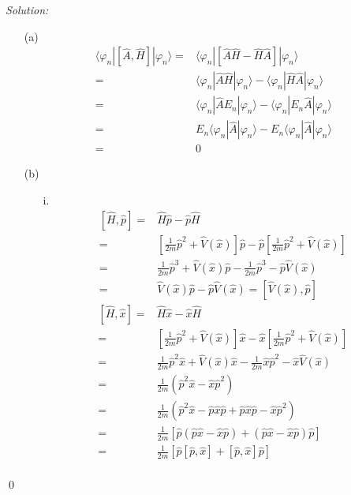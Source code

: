\documentclass[12pt,a4paper]{article}
\newenvironment{sol}
    {\emph{Solution:}
    }
    {
    \qed
    }
\begin{document}
\begin{sol}
\begin{itemize}
\item[(a)]
\begin{align}
\nonumber\langle\varphi_n|[\hat{A},\hat{H}]|\varphi_n\rangle=&\langle\varphi_n|[\hat{A}\hat{H}-\hat{H}\hat{A}]|\varphi_n\rangle\\
\nonumber=&\langle\varphi_n|\hat{A}\hat{H}|\varphi_n\rangle-\langle\varphi_n|\hat{H}\hat{A}|\varphi_n\rangle\\
\nonumber=&\langle\varphi_n|\hat{A}E_n|\varphi_n\rangle-\langle\varphi_n|E_n\hat{A}|\varphi_n\rangle\\
\nonumber=&E_n\langle\varphi_n|\hat{A}|\varphi_n\rangle-E_n\langle\varphi_n|\hat{A}|\varphi_n\rangle\\
=&0
\end{align}
\item[(b)]
\begin{itemize}
\item[i.]
\begin{align}
\nonumber[\hat{H},\hat{p}]=&\hat{H}\hat{p}-\hat{p}\hat{H}\\
\nonumber=&\left[\frac{1}{2m}\hat{p}^2+\hat{V}(\hat{x})\right]\hat{p}-\hat{p}\left[\frac{1}{2m}\hat{p}^2+\hat{V}(\hat{x})\right]\\
\nonumber=&\frac{1}{2m}\hat{p}^3+\hat{V}(\hat{x})\hat{p}-\frac{1}{2m}\hat{p}^3-\hat{p}\hat{V}(\hat{x})\\
=&\hat{V}(\hat{x})\hat{p}-\hat{p}\hat{V}(\hat{x})=[\hat{V}(\hat{x}),\hat{p}]
\end{align}
\begin{align}
\nonumber[\hat{H},\hat{x}]=&\hat{H}\hat{x}-\hat{x}\hat{H}\\
\nonumber=&\left[\frac{1}{2m}\hat{p}^2+\hat{V}(\hat{x})\right]\hat{x}-\hat{x}\left[\frac{1}{2m}\hat{p}^2+\hat{V}(\hat{x})\right]\\
\nonumber=&\frac{1}{2m}\hat{p}^2\hat{x}+\hat{V}(\hat{x})\hat{x}-\frac{1}{2m}\hat{x}\hat{p}^2-\hat{x}\hat{V}(\hat{x})\\
\nonumber=&\frac{1}{2m}(\hat{p}^2\hat{x}-\hat{x}\hat{p}^2)\\
\nonumber=&\frac{1}{2m}(\hat{p}^2\hat{x}-\hat{p}\hat{x}\hat{p}+\hat{p}\hat{x}\hat{p}-\hat{x}\hat{p}^2)\\
\nonumber=&\frac{1}{2m}[\hat{p}(\hat{p}\hat{x}-\hat{x}\hat{p})+(\hat{p}\hat{x}-\hat{x}\hat{p})\hat{p}]\\
\nonumber=&\frac{1}{2m}[\hat{p}[\hat{p},\hat{x}]+[\hat{p},\hat{x}]\hat{p}]\\

\end{align}
\end{itemize}
\end{itemize}
\end{sol}
\end{document}

